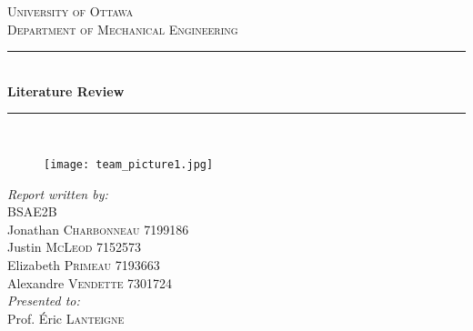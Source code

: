 \documentclass[12pt,twoside]{article}
\begin{document}
	
	\begin{titlepage}
		
		\newcommand{\HRule}{\rule{\linewidth}{0.5mm}} %
		
		\begin{center} %
			
			
			\textsc{\LARGE University of Ottawa}\\[1.0cm] %
			\textsc{\Large Department of Mechanical Engineering}\\[0.5cm] %
			
			
			\HRule \\[0.4cm]
			{ \huge \bfseries Literature Review}\\[0.4cm] %
			\HRule \\[0.5cm]
			
			\begin{figure}[H]
				\centering
				\texttt{[image: team\_picture1.jpg]} %
			\end{figure}
			
			
			\emph{Report written by:}\\[0.5cm]
			BSAE2B\\
			Jonathan \textsc{Charbonneau} 7199186\\
			Justin \textsc{McLeod} 7152573\\
			Elizabeth \textsc{Primeau} 7193663\\
			Alexandre \textsc{Vendette} 7301724\\[1cm]
			\emph{Presented to:}\\[0.5cm]
			Prof. Éric \textsc{Lanteigne}\\[1.5cm]
			

\end{center}
\end{titlepage}
\end{document}
